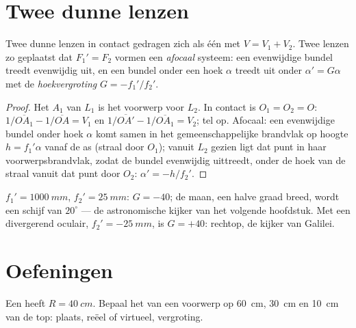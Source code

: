 \section{Twee dunne lenzen}

\begin{proposition}\label{prop:b1:mirrors-thin-lenses:doublet}
Twee dunne lenzen in contact gedragen zich als één  met 
$V = V_1 + V_2$. Twee lenzen zo geplaatst dat $F_1' = F_2$ vormen een
\emph{afocaal} systeem: een evenwijdige bundel treedt evenwijdig uit, en een
bundel onder een hoek $\alpha$ treedt uit onder $\alpha' = G\alpha$ met de
\emph{hoekvergroting} $G = -f_1'/f_2'$.
\end{proposition}

\begin{proof}
Het  $A_1$ van $L_1$ is het voorwerp voor $L_2$. In contact is
$O_1 = O_2 = O$: $1/\overline{OA_1} - 1/\overline{OA} = V_1$ en
$1/\overline{OA'} - 1/\overline{OA_1} = V_2$; tel op. Afocaal: een evenwijdige
bundel onder hoek $\alpha$ komt samen in het gemeenschappelijke brandvlak op
hoogte $h = f_1'\alpha$ vanaf de as (straal door $O_1$); vanuit $L_2$ gezien
ligt dat punt in haar voorwerpsbrandvlak, zodat de bundel evenwijdig uittreedt,
onder de hoek van de straal vanuit dat punt door $O_2$: $\alpha' = -h/f_2'$.
\end{proof}

\begin{example}\label{ex:b1:mirrors-thin-lenses:afocal}
$f_1' = \qty{1000}{mm}$, $f_2' = \qty{25}{mm}$: $G = -40$; de maan,
een halve graad breed, wordt een schijf van $20^\circ$ --- de astronomische
kijker van het volgende hoofdstuk. Met een divergerend oculair,
$f_2' = \qty{-25}{mm}$, is $G = +40$: rechtop, de kijker van Galilei.
\end{example}

\section{Oefeningen}

\begin{exercise}[$\star$]\label{exo:b1:mirrors-thin-lenses:1}
Een  heeft $R = \qty{40}{cm}$. Bepaal het  van een voorwerp
op \qty{60}{cm}, \qty{30}{cm} en \qty{10}{cm} van de top: plaats,
reëel of virtueel, vergroting.
\end{exercise}


